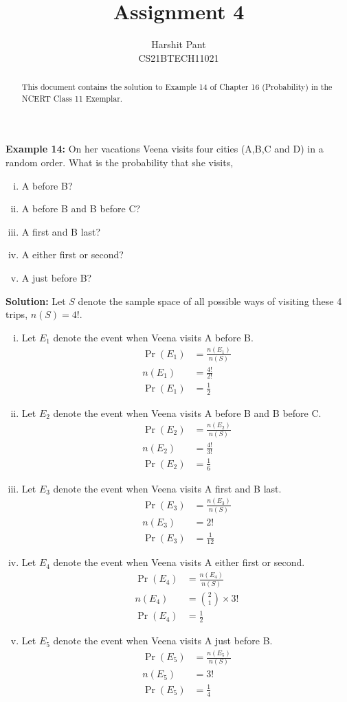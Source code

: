 \documentclass[journal,12pt,twocolumn]{IEEEtran}
\title{Assignment 4}
\author{Harshit Pant\\CS21BTECH11021}
\date{}
\providecommand{\pr}[1]{\ensuremath{\Pr\left(#1\right)}}
\begin{document}
\maketitle
\begin{abstract}
This document contains the solution to Example 14 of Chapter 16 (Probability) in the NCERT Class 11 Exemplar.
\end{abstract}
\textbf{Example 14:} On her vacations Veena visits four cities (A,B,C and D) in a random order. What is the probability that she visits,
\begin{enumerate}[(i)]
\item A before B?
\item A before B and B before C?
\item A first and B last?
\item A either first or second?
\item A just before B?
\end{enumerate}

\textbf{Solution:} Let $S$ denote the sample space of all possible ways of visiting these 4 trips, $n(S)=4!$.
\begingroup
\addtolength{\jot}{.1in}
\begin{enumerate}[(i)]
\item Let $E_1$ denote the event when Veena visits A before B.
\begin{align}
\pr{E_1}&=\frac{n(E_1)}{n(S)}\\
n(E_1)&=\frac{4!}{2!}\\
\pr{E_1}&=\frac{1}{2}
\end{align}
\item Let $E_2$ denote the event when Veena visits A before B and B before C.
\begin{align}
\pr{E_2}&=\frac{n(E_2)}{n(S)}\\
n(E_2)&=\frac{4!}{3!}\\
\pr{E_2}&=\frac{1}{6}
\end{align}
\item Let $E_3$ denote the event when Veena visits A first and B last.
\begin{align}
\pr{E_3}&=\frac{n(E_3)}{n(S)}\\
n(E_3)&=2!\\
\pr{E_3}&=\frac{1}{12}
\end{align}
\item Let $E_4$ denote the event when Veena visits A either first or second.
\begin{align}
\pr{E_4}&=\frac{n(E_4)}{n(S)}\\
n(E_4)&={2\choose 1}\times3!\\
\pr{E_4}&=\frac{1}{2}
\end{align}
\item Let $E_5$ denote the event when Veena visits A just before B.
\begin{align}
\pr{E_5}&=\frac{n(E_5)}{n(S)}\\
n(E_5)&=3!\\
\pr{E_5}&=\frac{1}{4}
\end{align}
\end{enumerate}
\endgroup
\end{document}
